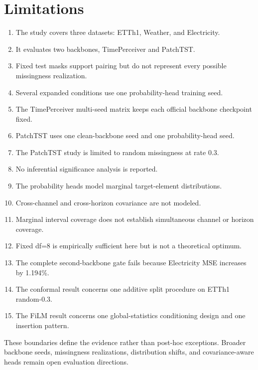 \section{Limitations}
\label{sec:limitations}

\begin{enumerate}
    \item The study covers three datasets: ETTh1, Weather, and Electricity.
    \item It evaluates two backbones, TimePerceiver and PatchTST.
    \item Fixed test masks support pairing but do not represent every possible missingness realization.
    \item Several expanded conditions use one probability-head training seed.
    \item The TimePerceiver multi-seed matrix keeps each official backbone checkpoint fixed.
    \item PatchTST uses one clean-backbone seed and one probability-head seed.
    \item The PatchTST study is limited to random missingness at rate 0.3.
    \item No inferential significance analysis is reported.
    \item The probability heads model marginal target-element distributions.
    \item Cross-channel and cross-horizon covariance are not modeled.
    \item Marginal interval coverage does not establish simultaneous channel or horizon coverage.
    \item Fixed df=8 is empirically sufficient here but is not a theoretical optimum.
    \item The complete second-backbone gate fails because Electricity MSE increases by 1.194\%.
    \item The conformal result concerns one additive split procedure on ETTh1 random-0.3.
    \item The FiLM result concerns one global-statistics conditioning design and one insertion pattern.
\end{enumerate}

These boundaries define the evidence rather than post-hoc exceptions. Broader backbone seeds, missingness realizations, distribution shifts, and covariance-aware heads remain open evaluation directions.
